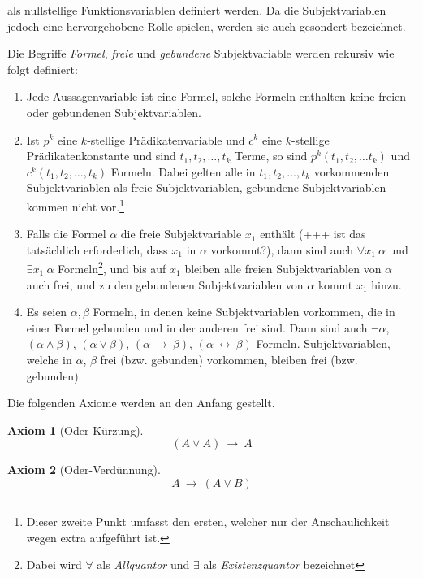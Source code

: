 \documentclass[a4paper,german,10pt,twoside]{book}
\newtheorem{ax}{Axiom}
\newcommand{\impl}{\ \rightarrow \ }
\newcommand{\equi}{\ \leftrightarrow \ }
\begin{document}
{{als nullstellige Funktionsvariablen definiert werden. Da die Subjektvariablen jedoch eine
hervorgehobene Rolle spielen, werden sie auch gesondert bezeichnet.}
\par
Die Begriffe \emph{Formel}, \emph{freie} und \emph{gebundene} Subjektvariable werden rekursiv wie folgt
definiert:
\begin{enumerate}
\item Jede Aussagenvariable ist eine Formel, solche Formeln enthalten keine freien oder gebundenen
Subjektvariablen. \item Ist $p^k$ eine $k$-stellige Pr{\"a}dikatenvariable und $c^k$ eine $k$-stellige
Pr{\"a}dikatenkonstante und sind $t_1, t_2, \ldots, t_k$ Terme, so sind $p^k(t_1, t_2, \ldots t_k)$ und
$c^k(t_1, t_2, \ldots, t_k)$ Formeln. Dabei gelten alle in $t_1, t_2, \ldots, t_k$ vorkommenden
Subjektvariablen als freie Subjektvariablen, gebundene Subjektvariablen kommen nicht
vor.\footnote{Dieser zweite Punkt umfasst den ersten, welcher nur der Anschaulichkeit wegen extra
aufgef{\"u}hrt ist.} \item Falls die Formel $\alpha$ die freie Subjektvariable $x_1$ enth{\"a}lt (+++ ist
das tats{\"a}chlich erforderlich, dass $x_1$ in $\alpha$ vorkommt?), dann sind auch $\forall
x_1~\alpha$ und $\exists x_1~\alpha$ Formeln\footnote{Dabei wird $\forall$ als
\emph{Allquantor} und $\exists$ als
\emph{Existenzquantor} bezeichnet}, und bis auf
$x_1$ bleiben alle freien Subjektvariablen von $\alpha$ auch frei, und zu den gebundenen
Subjektvariablen von $\alpha$ kommt $x_1$ hinzu. \item Es seien $\alpha, \beta$ Formeln, in denen
keine Subjektvariablen vorkommen, die in einer Formel gebunden und in der anderen frei sind. Dann
sind auch $\neg \alpha$, $(\alpha \land \beta)$, $(\alpha \lor \beta)$, $(\alpha \impl \beta)$,
$(\alpha \equi \beta)$ Formeln. Subjektvariablen, welche in $\alpha$, $\beta$ frei (bzw. gebunden)
vorkommen, bleiben frei (bzw. gebunden).
\end{enumerate}
\par
Die folgenden Axiome werden an den Anfang gestellt.
\begin{ax}[Oder-K{\"u}rzung]
$$(A \lor A) \impl A$$
\end{ax}

\begin{ax}[Oder-Verd{\"u}nnung]
$$A \impl (A \lor B)$$
\end{ax}

}
\end{document}

